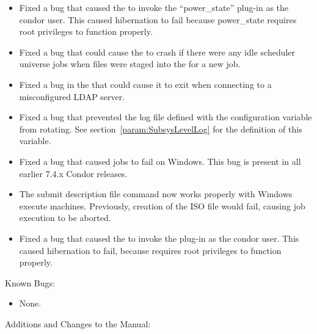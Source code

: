 \begin{itemize}
\item Fixed a bug that caused the  to invoke the
  ``power\_state'' plug-in as the condor user.  This caused
  hibernation to fail because power\_state requires root privileges
  to function properly.

\item Fixed a bug that could cause the  to crash if there
were any idle scheduler universe jobs when files were staged into the
 for a new job.

\item Fixed a bug in the  that could cause it to exit
when connecting to a misconfigured LDAP server.

\item Fixed a bug that prevented the log file defined with the configuration
variable  from rotating.
See section~\ref{param:SubsysLevelLog} for the definition of this variable. 

\item Fixed a bug that caused  jobs to fail on Windows. 
This bug is present in all earlier 7.4.x Condor releases.

\item The submit description file command 
now works properly with Windows execute machines. 
Previously, creation of the ISO file would fail, 
causing job execution to be aborted.

\item Fixed a bug that caused the  to invoke the
   plug-in as the condor user.
  This caused hibernation to fail, 
  because  requires root privileges to function properly.

\end{itemize}

\noindent Known Bugs:

\begin{itemize}

\item None.

\end{itemize}

\noindent Additions and Changes to the Manual:

